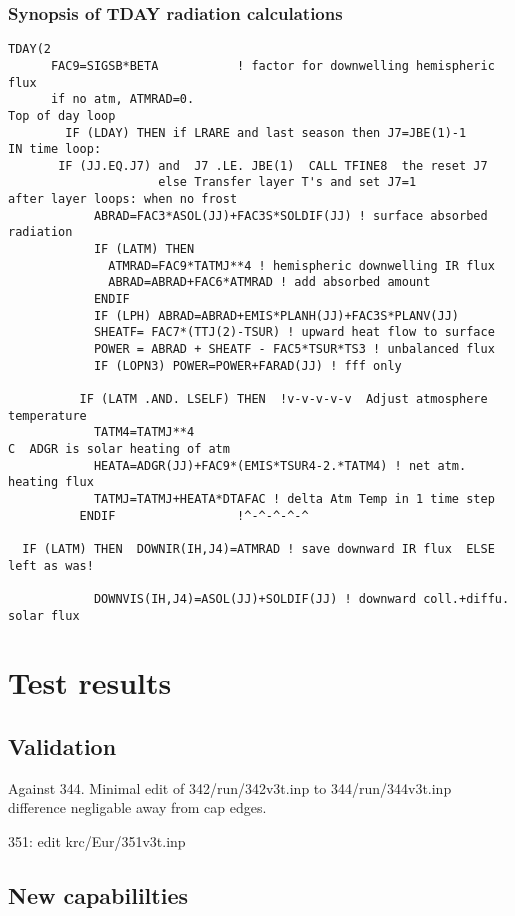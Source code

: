 \documentclass{article}
\begin{document}
\subsubsection{Synopsis of TDAY radiation calculations}
\begin{verbatim}
TDAY(2
      FAC9=SIGSB*BETA           ! factor for downwelling hemispheric flux
      if no atm, ATMRAD=0.
Top of day loop
        IF (LDAY) THEN if LRARE and last season then J7=JBE(1)-1 
IN time loop:
       IF (JJ.EQ.J7) and  J7 .LE. JBE(1)  CALL TFINE8  the reset J7
                     else Transfer layer T's and set J7=1 
after layer loops: when no frost
            ABRAD=FAC3*ASOL(JJ)+FAC3S*SOLDIF(JJ) ! surface absorbed radiation
            IF (LATM) THEN 
              ATMRAD=FAC9*TATMJ**4 ! hemispheric downwelling IR flux
              ABRAD=ABRAD+FAC6*ATMRAD ! add absorbed amount
            ENDIF 
            IF (LPH) ABRAD=ABRAD+EMIS*PLANH(JJ)+FAC3S*PLANV(JJ)
            SHEATF= FAC7*(TTJ(2)-TSUR) ! upward heat flow to surface
            POWER = ABRAD + SHEATF - FAC5*TSUR*TS3 ! unbalanced flux
            IF (LOPN3) POWER=POWER+FARAD(JJ) ! fff only

          IF (LATM .AND. LSELF) THEN  !v-v-v-v-v  Adjust atmosphere temperature
            TATM4=TATMJ**4
C  ADGR is solar heating of atm
            HEATA=ADGR(JJ)+FAC9*(EMIS*TSUR4-2.*TATM4) ! net atm. heating flux
            TATMJ=TATMJ+HEATA*DTAFAC ! delta Atm Temp in 1 time step
          ENDIF                 !^-^-^-^-^

  IF (LATM) THEN  DOWNIR(IH,J4)=ATMRAD ! save downward IR flux  ELSE left as was!

            DOWNVIS(IH,J4)=ASOL(JJ)+SOLDIF(JJ) ! downward coll.+diffu. solar flux
\end{verbatim}

\section{Test results}
\subsection {Validation}
 Against 344.  Minimal edit of 342/run/342v3t.inp to 344/run/344v3t.inp
\qi difference negligable away from cap edges.
 

351: edit krc/Eur/351v3t.inp

\subsection {New capabililties}
\end{document}
